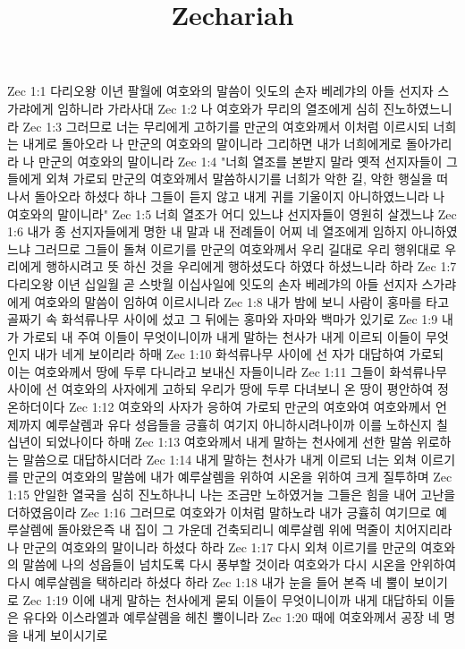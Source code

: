 

\title{Zechariah}

Zec 1:1  다리오왕 이년 팔월에 여호와의 말씀이 잇도의 손자 베레갸의 아들 선지자 스가랴에게 임하니라 가라사대
Zec 1:2  나 여호와가 무리의 열조에게 심히 진노하였느니라
Zec 1:3  그러므로 너는 무리에게 고하기를 만군의 여호와께서 이처럼 이르시되 너희는 내게로 돌아오라 나 만군의 여호와의 말이니라 그리하면 내가 너희에게로 돌아가리라 나 만군의 여호와의 말이니라
Zec 1:4  "너희 열조를 본받지 말라 옛적 선지자들이 그들에게 외쳐 가로되 만군의 여호와께서 말씀하시기를 너희가 악한 길, 악한 행실을 떠나서 돌아오라 하셨다 하나 그들이 듣지 않고 내게 귀를 기울이지 아니하였느니라 나 여호와의 말이니라"
Zec 1:5  너희 열조가 어디 있느냐 선지자들이 영원히 살겠느냐
Zec 1:6  내가 종 선지자들에게 명한 내 말과 내 전례들이 어찌 네 열조에게 임하지 아니하였느냐 그러므로 그들이 돌쳐 이르기를 만군의 여호와께서 우리 길대로 우리 행위대로 우리에게 행하시려고 뜻 하신 것을 우리에게 행하셨도다 하였다 하셨느니라 하라
Zec 1:7  다리오왕 이년 십일월 곧 스밧월 이십사일에 잇도의 손자 베레갸의 아들 선지자 스가랴에게 여호와의 말씀이 임하여 이르시니라
Zec 1:8  내가 밤에 보니 사람이 홍마를 타고 골짜기 속 화석류나무 사이에 섰고 그 뒤에는 홍마와 자마와 백마가 있기로
Zec 1:9  내가 가로되 내 주여 이들이 무엇이니이까 내게 말하는 천사가 내게 이르되 이들이 무엇인지 내가 네게 보이리라 하매
Zec 1:10  화석류나무 사이에 선 자가 대답하여 가로되 이는 여호와께서 땅에 두루 다니라고 보내신 자들이니라
Zec 1:11  그들이 화석류나무 사이에 선 여호와의 사자에게 고하되 우리가 땅에 두루 다녀보니 온 땅이 평안하여 정온하더이다
Zec 1:12  여호와의 사자가 응하여 가로되 만군의 여호와여 여호와께서 언제까지 예루살렘과 유다 성읍들을 긍휼히 여기지 아니하시려나이까 이를 노하신지 칠십년이 되었나이다 하매
Zec 1:13  여호와께서 내게 말하는 천사에게 선한 말씀 위로하는 말씀으로 대답하시더라
Zec 1:14  내게 말하는 천사가 내게 이르되 너는 외쳐 이르기를 만군의 여호와의 말씀에 내가 예루살렘을 위하여 시온을 위하여 크게 질투하며
Zec 1:15  안일한 열국을 심히 진노하나니 나는 조금만 노하였거늘 그들은 힘을 내어 고난을 더하였음이라
Zec 1:16  그러므로 여호와가 이처럼 말하노라 내가 긍휼히 여기므로 예루살렘에 돌아왔은즉 내 집이 그 가운데 건축되리니 예루살렘 위에 먹줄이 치어지리라 나 만군의 여호와의 말이니라 하셨다 하라
Zec 1:17  다시 외쳐 이르기를 만군의 여호와의 말씀에 나의 성읍들이 넘치도록 다시 풍부할 것이라 여호와가 다시 시온을 안위하여 다시 예루살렘을 택하리라 하셨다 하라
Zec 1:18  내가 눈을 들어 본즉 네 뿔이 보이기로
Zec 1:19  이에 내게 말하는 천사에게 묻되 이들이 무엇이니이까 내게 대답하되 이들은 유다와 이스라엘과 예루살렘을 헤친 뿔이니라
Zec 1:20  때에 여호와께서 공장 네 명을 내게 보이시기로
